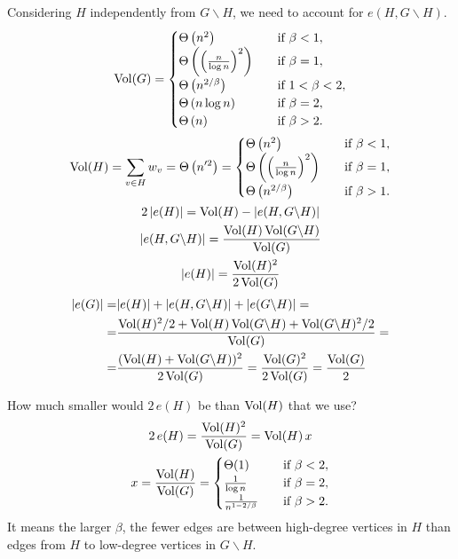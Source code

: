 Considering $H$ independently from $G\backslash H$,
we need to account for $e(H,G\backslash H)$.
\begin{gather}
    \operatorname*{Vol}(G)=\begin{cases}
        \Theta\left(n^2\right) & \quad \text{if } \beta<1,\\
        \Theta\left(\left(\frac{n}{\log n}\right)^2\right) & \quad \text{if } \beta=1,\\
        \Theta\left(n^{2/\beta}\right) & \quad \text{if } 1<\beta<2,\\
        \Theta\left(n\log n\right) & \quad \text{if } \beta=2,\\
        \Theta\left(n\right) & \quad \text{if } \beta>2.
    \end{cases}\\
    \operatorname*{Vol}(H)=\sum_{v\in H}{w_v}=\Theta\left(n'^2\right)=\begin{cases}
        \Theta\left(n^2\right) & \quad \text{if } \beta<1,\\
        \Theta\left(\left(\frac{n}{\log n}\right)^2\right) & \quad \text{if } \beta=1,\\
        \Theta\left(n^{2/\beta}\right) & \quad \text{if } \beta>1.
    \end{cases}\\
    2\,|e(H)|=\operatorname*{Vol}(H)-|e(H,G\backslash H)|\\
    |e(H,G\backslash H)|=\frac{\operatorname*{Vol}(H)\operatorname*{Vol}(G\backslash H)}{\operatorname*{Vol}(G)}\\
    |e(H)|=\frac{\operatorname*{Vol}(H)^2}{2\operatorname*{Vol}(G)}
\end{gather}
\begin{equation}
    \begin{split}
        |e(G)|=&|e(H)|+|e(H,G\backslash H)|+|e(G\backslash H)|=\\
        =&\frac{\operatorname*{Vol}(H)^2/2+\operatorname*{Vol}(H)\operatorname*{Vol}(G\backslash H)+\operatorname*{Vol}(G\backslash H)^2/2}{\operatorname*{Vol}(G)}=\\
        =&\frac{(\operatorname*{Vol}(H)+\operatorname*{Vol}(G\backslash H))^2}{2\operatorname*{Vol}(G)}
        =\frac{\operatorname*{Vol}(G)^2}{2\operatorname*{Vol}(G)}=\frac{\operatorname*{Vol}(G)}{2}
    \end{split}
\end{equation}

How much smaller would $2\,e(H)$ be than $\operatorname*{Vol}(H)$ that we use?
\begin{gather}
    2\,e(H)=\frac{\operatorname*{Vol}(H)^2}{\operatorname*{Vol}(G)}=\operatorname*{Vol}(H)\,x\\
    x=\frac{\operatorname*{Vol}(H)}{\operatorname*{Vol}(G)}=\begin{cases}
        \Theta(1) & \quad \text{if } \beta<2,\\
        \frac{1}{\log n} & \quad \text{if } \beta=2,\\
        \frac{1}{n^{1-2/\beta}} & \quad \text{if } \beta>2.
    \end{cases}
\end{gather}
It means the larger $\beta$, the fewer edges are between high-degree vertices in $H$
than edges from $H$ to low-degree vertices in $G\backslash H$.


